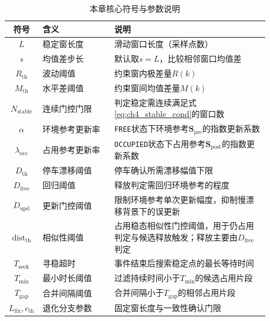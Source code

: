 \begin{table}[t]
    \centering
    \caption{本章核心符号与参数说明}
    \label{tab:ch4_keyparams}
    \begin{tabular}{c p{0.28\linewidth} p{0.60\linewidth}}
        \hline
        符号 & 含义 & 说明 \\
        \hline
        $L$ & 稳定窗长度 & 滑动窗口长度（采样点数） \\
        $s$ & 均值差步长 & 默认取$s=L$，比较相邻窗口均值差 \\
        $R_{\mathrm{th}}$ & 波动阈值 & 约束窗内极差量$R(k)$ \\
        $M_{\mathrm{th}}$ & 水平差阈值 & 约束窗间均值差量$M(k)$ \\
        $N_{\mathrm{stable}}$ & 连续门控门限 & 判定稳定需连续满足式\eqref{eq:ch4_stable_cond}的窗口数 \\
        $\alpha$ & 环境参考更新率 & \texttt{FREE}状态下环境参考$\mathbf{S}_{\mathrm{pre}}$的指数更新系数 \\
        $\lambda_{\mathrm{occ}}$ & 占用参考更新率 & \texttt{OCCUPIED}状态下占用参考$\mathbf{S}_{\mathrm{post}}$的指数更新系数 \\
        $D_{\mathrm{th}}$ & 停车漂移阈值 & 停车确认所需漂移幅值下限 \\
        $D_{\mathrm{free}}$ & 回归阈值 & 释放判定需回归环境参考的程度 \\
        $D_{\mathrm{upd}}$ & 更新门控阈值 & 限制环境参考单次更新幅度，抑制慢漂移背景下的误更新 \\
        $\mathrm{dist}_{\mathrm{th}}$ & 相似性阈值 & 占用稳态相似性门控阈值，用于仍占用判定与候选释放触发；释放主要由$D_{\mathrm{free}}$判定 \\
        $T_{\mathrm{seek}}$ & 寻稳超时 & 事件结束后搜索稳定点的最长等待时间 \\
        $T_{\min}$ & 最小时长阈值 & 过滤持续时间小于$T_{\min}$的候选占用片段 \\
        $T_{\mathrm{gap}}$ & 合并间隔阈值 & 合并间隔小于$T_{\mathrm{gap}}$的相邻占用片段 \\
        $L_{\mathrm{fix}},c_{\mathrm{th}}$ & 退化分支参数 & 固定窗长度与一致性确认门限 \\
        \hline
    \end{tabular}
\end{table}

